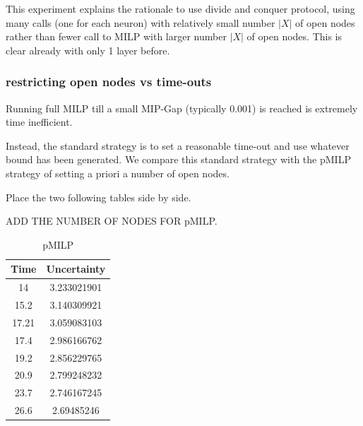 This experiment explains the rationale to use divide and conquer protocol, using many calls
(one for each neuron) with relatively small number $|X|$ of open nodes rather than fewer call to MILP with larger number $|X|$ of open nodes. This is clear already with only 1 layer before.


	




\subsubsection*{restricting open nodes vs time-outs}	

Running full MILP till a small MIP-Gap (typically 0.001) is reached is extremely time inefficient.

Instead, the standard strategy is to set a reasonable time-out and use whatever bound has been generated. We compare this standard strategy with the pMILP strategy of setting a priori a number of open nodes.

Place the two following tables side by side.


ADD THE NUMBER OF NODES FOR pMILP.




\begin{table}[h!]
	\centering
	\begin{tabular}{|c|c|}
	\hline
		Time & Uncertainty\\ 
	\hline	14 & 3.233021901\\
\hline	15.2 & 3.140309921\\
\hline	17.21 & 3.059083103\\
\hline	17.4 & 2.986166762\\
\hline	19.2 & 2.856229765\\
\hline	20.9 & 2.799248232\\
\hline	23.7 & 2.746167245\\
\hline	26.6 & 2.69485246\\	
	\hline
	
	
	\end{tabular}
	\caption{pMILP}
	\label{table12}
	\end{table}
	


